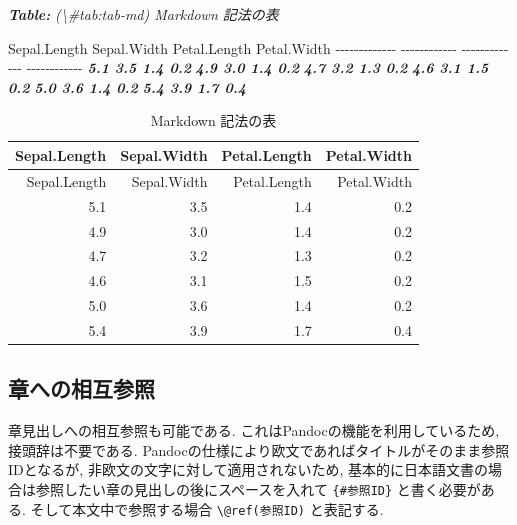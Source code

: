 \documentclass[
  xelatex,ja=standard,jafont=noto]{bxjsbook}
\newenvironment{Shaded}{\begin{snugshade}}{\end{snugshade}}
\newcommand{\AnnotationTok}[1]{\textcolor[rgb]{0.56,0.35,0.01}{\textbf{\textit{#1}}}}
\newcommand{\CommentTok}[1]{\textcolor[rgb]{0.56,0.35,0.01}{\textit{#1}}}
\newcommand{\InformationTok}[1]{\textcolor[rgb]{0.56,0.35,0.01}{\textbf{\textit{#1}}}}
\newcommand{\NormalTok}[1]{#1}
\theoremstyle{definition}
\theoremstyle{definition}
\theoremstyle{definition}
\theoremstyle{definition}
\theoremstyle{remark}
\begin{document}
\begin{Shaded}
\begin{Highlighting}[]
\AnnotationTok{Table:}\CommentTok{ (\textbackslash{}\#tab:tab{-}md) Markdown 記法の表}

\NormalTok{ Sepal.Length   Sepal.Width   Petal.Length   Petal.Width}
\NormalTok{{-}{-}{-}{-}{-}{-}{-}{-}{-}{-}{-}{-}{-}  {-}{-}{-}{-}{-}{-}{-}{-}{-}{-}{-}{-}  {-}{-}{-}{-}{-}{-}{-}{-}{-}{-}{-}{-}{-}  {-}{-}{-}{-}{-}{-}{-}{-}{-}{-}{-}{-}}
\InformationTok{          5.1           3.5            1.4           0.2}
\InformationTok{          4.9           3.0            1.4           0.2}
\InformationTok{          4.7           3.2            1.3           0.2}
\InformationTok{          4.6           3.1            1.5           0.2}
\InformationTok{          5.0           3.6            1.4           0.2}
\InformationTok{          5.4           3.9            1.7           0.4}
\end{Highlighting}
\end{Shaded}

\begin{longtable}[]{@{}rrrr@{}}
\caption{\label{tab:tab-md} Markdown 記法の表}\tabularnewline
\toprule
Sepal.Length & Sepal.Width & Petal.Length & Petal.Width \\
\midrule
\endfirsthead
\toprule
Sepal.Length & Sepal.Width & Petal.Length & Petal.Width \\
\midrule
\endhead
5.1 & 3.5 & 1.4 & 0.2 \\
4.9 & 3.0 & 1.4 & 0.2 \\
4.7 & 3.2 & 1.3 & 0.2 \\
4.6 & 3.1 & 1.5 & 0.2 \\
5.0 & 3.6 & 1.4 & 0.2 \\
5.4 & 3.9 & 1.7 & 0.4 \\
\bottomrule
\end{longtable}

\hypertarget{ux7ae0ux3078ux306eux76f8ux4e92ux53c2ux7167}{%
\subsection{章への相互参照}\label{ux7ae0ux3078ux306eux76f8ux4e92ux53c2ux7167}}

章見出しへの相互参照も可能である. これはPandocの機能を利用しているため,
接頭辞は不要である.
Pandocの仕様により欧文であればタイトルがそのまま参照IDとなるが,
非欧文の文字に対して適用されないため,
基本的に日本語文書の場合は参照したい章の見出しの後にスペースを入れて
\texttt{\{\#参照ID\}} と書く必要がある. そして本文中で参照する場合
\texttt{\textbackslash{}@ref(参照ID)} と表記する.
\end{document}
